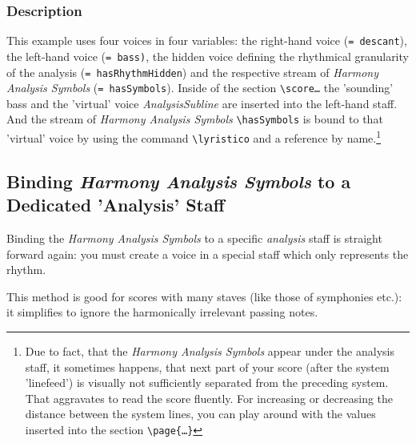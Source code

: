 \documentclass[
  DIV=calc,
  BCOR=5mm,
  12pt,
  headings=small,
  oneside,
  abstract=true,
  toc=bib,
  xcolor=dvipsnames,
  openany,
  english]{scrartcl}
\newcommand{\acc}[0]{\textit}
\newcommand{\has}[1]{\textit{Harmony Analysis Symbol#1}}
\begin{document}
\subsubsection{Description}

This example uses four voices in four variables: the right-hand voice
(\texttt{= descant}), the left-hand voice (\texttt{= bass)}, the hidden voice
defining the rhythmical granularity of the analysis (\texttt{= hasRhythmHidden})
and the respective stream of \has{s} (\texttt{= hasSymbols}). Inside of the
section \texttt{\textbackslash score{\ldots}} the 'sounding' bass and the
'virtual' voice \acc{AnalysisSubline} are inserted into the left-hand staff. And
the stream of \has{s} \texttt{\textbackslash hasSymbols} is bound to that
'virtual' voice by using the command \texttt{\textbackslash lyristico} and a
reference by name.\footnote{Due to fact, that the \has{s} appear under the
analysis staff, it sometimes happens, that next part of your score (after the
system 'linefeed') is visually not sufficiently separated from the preceding
system. That aggravates to read the score fluently. For increasing or decreasing
the distance between the system lines, you can play around with the values
inserted into the section \texttt{\textbackslash page\{\ldots\}}}


\subsection{Binding \has{s} to a Dedicated 'Analysis' Staff}
\label{BindingToDedicatedAnalysisStaff}

Binding the \has{s} to a specific \acc{analysis} staff is straight forward
again: you must create a voice in a special staff which only represents the
rhythm.

This method is good for scores with many staves (like those of symphonies etc.):
it simplifies to ignore the harmonically irrelevant passing notes.
\end{document}
